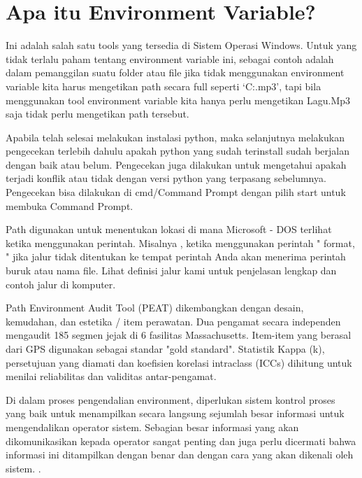 
\section {Apa itu Environment Variable?}
Ini adalah salah satu tools yang tersedia di Sistem Operasi Windows. Untuk yang tidak terlalu paham tentang environment variable ini, sebagai contoh adalah dalam pemanggilan suatu folder atau file jika tidak menggunakan environment variable kita harus mengetikan path secara full seperti `C:\Music\Lagu.mp3', tapi bila menggunakan tool environment variable kita hanya perlu mengetikan Lagu.Mp3 saja tidak perlu mengetikan path tersebut.

Apabila telah selesai melakukan instalasi python, maka selanjutnya melakukan pengecekan terlebih dahulu apakah python yang sudah terinstall sudah berjalan dengan baik atau belum. Pengecekan juga dilakukan untuk mengetahui apakah terjadi konflik atau tidak dengan versi python yang terpasang sebelumnya. Pengecekan bisa dilakukan di cmd/Command Prompt dengan pilih start untuk membuka Command Prompt.

Path digunakan untuk menentukan lokasi di mana Microsoft - DOS terlihat ketika menggunakan perintah. Misalnya , ketika menggunakan perintah " format, " jika jalur tidak ditentukan ke tempat perintah Anda akan menerima perintah buruk atau nama file.  Lihat definisi jalur kami untuk penjelasan lengkap dan contoh jalur di komputer.

Path Environment Audit Tool (PEAT) dikembangkan dengan desain, kemudahan, dan estetika / item perawatan. Dua pengamat secara independen mengaudit 185 segmen jejak di 6 fasilitas Massachusetts. Item-item yang berasal dari GPS digunakan sebagai standar "gold standard". Statistik Kappa (k), persetujuan yang diamati dan koefisien korelasi intraclass (ICCs) dihitung untuk menilai reliabilitas dan validitas antar-pengamat.

Di dalam proses pengendalian environment, diperlukan sistem kontrol proses yang baik untuk menampilkan secara langsung sejumlah besar informasi untuk mengendalikan operator sistem. Sebagian besar informasi yang akan dikomunikasikan kepada operator sangat penting dan juga perlu dicermati bahwa informasi ini ditampilkan dengan benar dan dengan cara yang akan dikenali oleh sistem. \cite{kilgore1997directly}.

